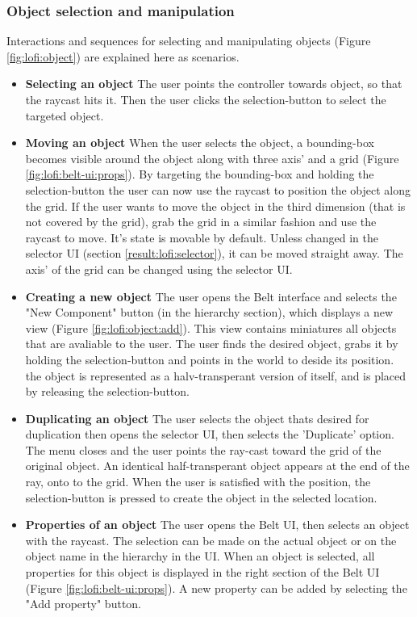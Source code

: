 \subsubsection{Object selection and manipulation}
Interactions and sequences for selecting and manipulating objects (Figure \ref{fig:lofi:object}) are explained here as scenarios.
\begin{itemize}
  \item \textbf{Selecting an object} The user points the controller towards object, so that the raycast hits it. Then the user clicks the selection-button to select the targeted object.
  \item \textbf{Moving an object} When the user selects the object, a bounding-box becomes visible around the object along with three axis' and a grid (Figure \ref{fig:lofi:belt-ui:props}). By targeting the bounding-box and holding the selection-button the user can now use the raycast to position the object along the grid. If the user wants to move the object in the third dimension (that is not covered by the grid), grab the grid in a similar fashion and use the raycast to move. It's state is movable by default. Unless changed in the selector UI (section \ref{result:lofi:selector}), it can be moved straight away. The axis' of the grid can be changed using the selector UI.
  \item \textbf{Creating a new object} The user opens the Belt interface and selects the "New Component" button (in the hierarchy section), which displays a new view (Figure \ref{fig:lofi:object:add}). This view contains miniatures all objects that are avaliable to the user. The user finds the desired object, grabs it by holding the selection-button and points in the world to deside its position. the object is represented as a halv-transperant version of itself, and is placed by releasing the selection-button.
  \item \textbf{Duplicating an object} The user selects the object thats desired for duplication then opens the selector UI, then selects the 'Duplicate' option. The menu closes and the user points the ray-cast toward the grid of the original object. An identical half-transperant object appears at the end of the ray, onto to the grid. When the user is satisfied with the position, the selection-button is pressed to create the object in the selected location.
  \item \textbf{Properties of an object} The user opens the Belt UI, then selects an object with the raycast. The selection can be made on the actual object or on the object name in the hierarchy in the UI. When an object is selected, all properties for this object is displayed in the right section of the Belt UI (Figure \ref{fig:lofi:belt-ui:props}). A new property can be added by selecting the "Add property" button.
\end{itemize}

